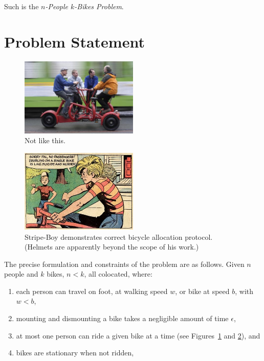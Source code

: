 \documentclass[DIV=calc, paper=a4, fontsize=11pt, twocolumn]{scrartcl}	 %
\newcommand{\initial}[1]{ %
\lettrine[lines=3,lhang=0.3,nindent=0em]{
\color{DarkGoldenrod}
{\textsf{#1}}}{}}
\newcommand\prob{$n$-People $k$-Bikes Problem}
\begin{document}
Such is the {\em \prob}.

\section{Problem Statement}

\begin{figure}[h]
	\begin{center}
	\includegraphics[width=0.5\textwidth]{conference.jpg}
	\end{center}
	\caption{Not like this.}
	\label{fig:conference}
\end{figure}
\begin{figure}[h]
	\begin{center}
	\includegraphics[width=0.5\textwidth]{suicideandmurder.jpg}
	\end{center}
	\caption{Stripe-Boy demonstrates correct bicycle allocation protocol. (Helmets are apparently beyond the scope of his work.)}
	\label{fig:stripey}
\end{figure}

{T}he precise formulation and constraints of the problem are as follows.
\initial{G}iven $n$ people and $k$ bikes, $n<k$, all colocated, where:
\begin{enumerate}
	\setlength{\itemsep}{-0.5em}
	\item each person can travel on foot, at walking speed $w$, or bike at speed $b$, with $w<b$,
	\item mounting and dismounting a bike takes a negligible amount of time $\epsilon$,
	\item at most one person can ride a given bike at a time (see Figures~\ref{fig:conference} and \ref{fig:stripey}), and
	\item bikes are stationary when not ridden,
\end{enumerate}
\end{document}
